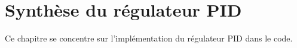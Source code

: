 \chapter{Synthèse du régulateur PID}
Ce chapitre se concentre sur l'implémentation du régulateur PID dans le code.


